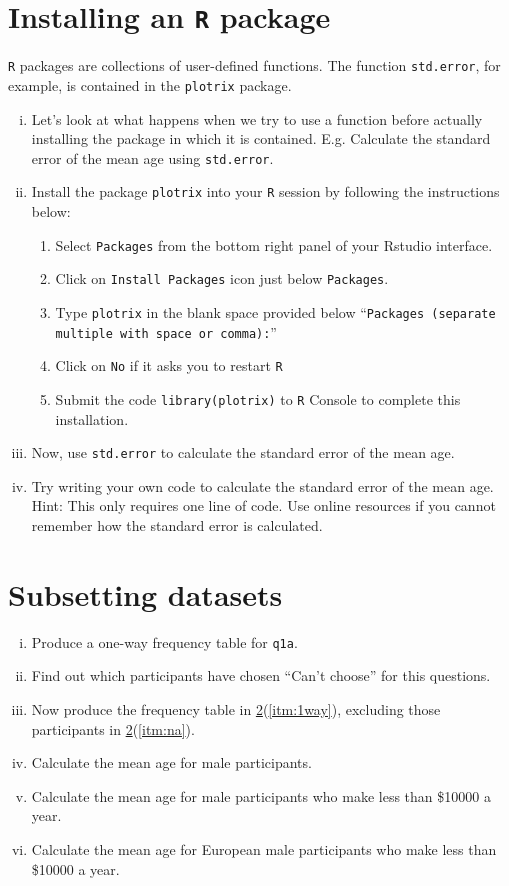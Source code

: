 \documentclass[12pt,a4paper]{article}
\begin{document}
\section{Installing an \texttt{R} package}
\label{sec:pack}
\texttt{R} packages are collections of user-defined functions. The function
\texttt{std.error}, for example, is contained in the \texttt{plotrix} package.
\begin{enumerate}[(i)]
  \item Let's look at what happens when we try to use a function
    before actually installing the package in which it is
    contained. E.g. Calculate the standard error of the mean age using
    \texttt{std.error}.  
\item Install the package \texttt{plotrix} into your \texttt{R}
  session by following the instructions below: 
  \begin{enumerate}
  \item Select \texttt{Packages} from the bottom right panel of your
    Rstudio interface.
  \item Click on \texttt{Install Packages} icon just below \texttt{Packages}.
  \item Type \texttt{plotrix} in the blank space provided below
    ``\texttt{Packages (separate multiple with space or comma):}''
  \item Click on \texttt{No} if it asks you to restart \texttt{R}
  \item Submit the code \texttt{library(plotrix)} to \texttt{R} Console
    to complete this installation.
  \end{enumerate}
\item Now, use \texttt{std.error} to calculate the standard error of
  the mean age. 
\item Try writing your own code to calculate the standard error of the
  mean age. Hint: This only requires one line of code. Use online resources
if you cannot remember how the standard error is calculated.
\end{enumerate}
 
\section{Subsetting datasets}
\label{sec:sub}
\begin{enumerate}[(i)]
\item \label{itm:1way} Produce a one-way frequency table for \texttt{q1a}.
\item \label{itm:na} Find out which participants have chosen ``Can't
  choose'' for this questions.
\item Now produce the frequency table in
  \ref{sec:sub}(\ref{itm:1way}), excluding those participants in
  \ref{sec:sub}(\ref{itm:na}).
\item Calculate the mean age for male participants.
\item Calculate the mean age for male participants who make less than
  \$10000 a year.
\item Calculate the mean age for European male participants who make less than
  \$10000 a year.
\end{enumerate}
 
\end{document}
